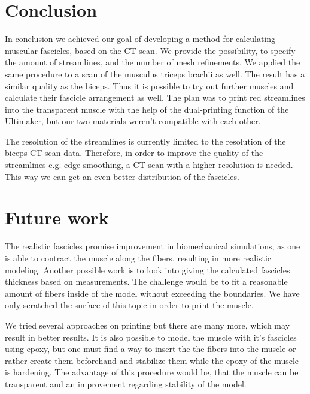 \documentclass[preprint,journal]{vgtc}       %
\begin{document}
\section{Conclusion}
In conclusion we achieved our goal of developing a method for calculating muscular fascicles, based on the CT-scan.
We provide the possibility, to specify the amount of streamlines, and the number of mesh refinements. 
We applied the same procedure to a scan of the musculus triceps brachii as well. 
The result has a similar quality as the biceps.
Thus it is possible to try out further muscles and calculate their fascicle arrangement as well.
The plan was to print red streamlines into the transparent muscle with the help of the dual-printing function of the Ultimaker, but our two materials weren't compatible with each other. 

The resolution of the streamlines is currently limited to the resolution of the biceps CT-scan data. 
Therefore, in order to improve the quality of the streamlines e.g. edge-smoothing, a CT-scan with a higher resolution is needed. 
This way we can get an even better distribution of the fascicles.

\section{Future work}
The realistic fascicles promise improvement in biomechanical simulations, as one is able to contract the muscle along the fibers, resulting in more realistic modeling. 
Another possible work is to look into giving the calculated fascicles thickness based on measurements. 
The challenge would be to fit a reasonable amount of fibers inside of the model without exceeding the boundaries.
We have only scratched the surface of this topic in order to print the muscle.

We tried several approaches on printing but there are many more, which may result in better results.
It is also possible to model the muscle with it's fascicles using epoxy, but one must find a way to insert the the fibers into the muscle or rather create them beforehand and stabilize them while the epoxy of the muscle is hardening.
The advantage of this procedure would be, that the muscle can be transparent and an improvement regarding stability of the model.



\end{document}
